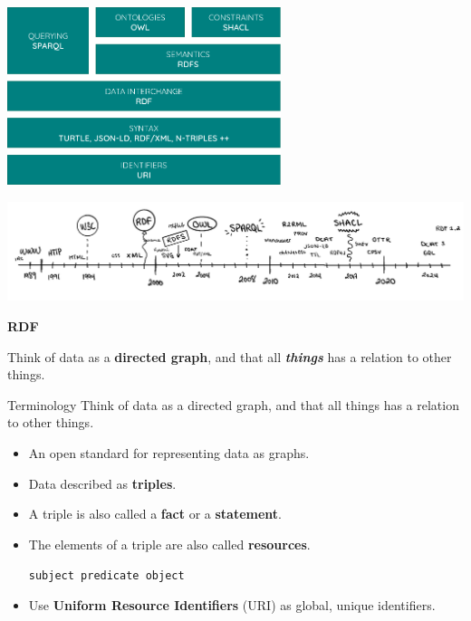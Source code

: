 \documentclass{dt}
\begin{document}
\begin{frame}
\begin{center}
\includegraphics[width=0.6\textwidth]{img/stack-2.png}
\end{center}
\end{frame}

\begin{frame}
\begin{center}
\includegraphics[width=\textwidth]{img/timeline.png}
\end{center}
\end{frame}


\begin{frame}
\Huge{\textbf{RDF}}
\end{frame}


\begin{frame}
Think of data as a \textbf{directed graph}, and that all \textbf{\textit{things}} has a relation to other things.
\end{frame}

\begin{frame}{Terminology}
Think of data as a directed graph, and that all things has a relation to other things.

\begin{itemize}
\item An open standard for representing data as graphs.
\begin{center}
\end{center}
\item Data described as \textbf{triples}.
\item A triple is also called a \textbf{fact} or a \textbf{statement}.
\item The elements of a triple are also called \textbf{resources}.
\begin{center}
\texttt{subject predicate object}
\end{center}
\item Use \textbf{Uniform Resource Identifiers} (URI) as global, unique identifiers.
\end{itemize}
\end{frame}
\end{document}
